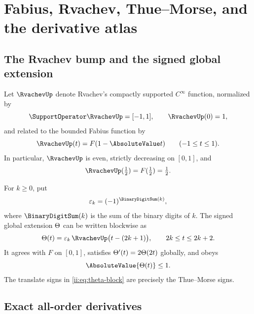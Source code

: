 \section{Fabius, Rvachev, Thue--Morse, and the derivative atlas}
\label{ii:sec:background}

\subsection{The Rvachev bump and the signed global extension}

Let $\RvachevUp$ denote Rvachev's compactly supported $C^\infty$ function, normalized by
\[
 \SupportOperator\RvachevUp=[-1,1],\qquad \RvachevUp(0)=1,
\]
and related to the bounded Fabius function by
\begin{equation}
 \RvachevUp(t)=F(1-\AbsoluteValue t)\qquad(-1\leq t\leq1).
 \label{ii:eq:up-F}
\end{equation}
In particular, $\RvachevUp$ is even, strictly decreasing on $[0,1]$, and
\begin{equation}
 \RvachevUp(\half)=F(\half)=\half.
 \label{ii:eq:up-half}
\end{equation}

For $k\geq0$, put
\begin{equation}
  \eps_k=(-1)^{\BinaryDigitSum(k)},
  \label{ii:eq:tm-sign}
\end{equation}
where $\BinaryDigitSum(k)$ is the sum of the binary digits of $k$.  The signed global extension
$\Theta$ can be written blockwise as
\begin{equation}
 \ThetaF(t)=\eps_k\,\RvachevUp\bigl(t-(2k+1)\bigr),
 \qquad 2k\leq t\leq2k+2.
 \label{ii:eq:theta-block}
\end{equation}
It agrees with $F$ on $[0,1]$, satisfies $\Theta'(t)=2\Theta(2t)$ globally, and obeys
\begin{equation}
 \AbsoluteValue{\ThetaF(t)}\leq1.
 \label{ii:eq:theta-bound}
\end{equation}
The translate signs in \eqref{ii:eq:theta-block} are precisely the Thue--Morse signs.

\subsection{Exact all-order derivatives}

